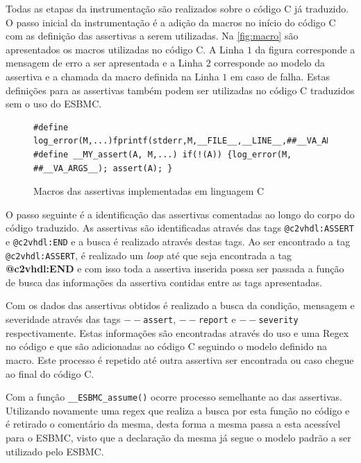 \par
Todas as etapas da instrumentação são realizados sobre o código C já traduzido. O passo inicial da instrumentação é a adição da macros no início do código C com as definição das assertivas a serem utilizadas. Na \autoref{fig:macro} são apresentados os macros utilizadas no código C. A Linha $1$ da figura corresponde a mensagem de erro a ser apresentada e a Linha $2$ corresponde ao modelo da assertiva e a chamada da macro definida na Linha $1$ em caso de falha. Estas definições para as assertivas também podem ser utilizadas no código C traduzidos sem o uso do ESBMC.


\begin{figure}[H]
\caption{\label{fig:macro} Macros das assertivas implementadas em linguagem C}
	\begin{center}
    \begin{minipage}{0.99\textwidth}
    \begin{lstlisting}       
#define log_error(M,...)fprintf(stderr,M,__FILE__,__LINE__,##__VA_ARGS__)
#define __MY_assert(A, M,...) if(!(A)) {log_error(M, ##__VA_ARGS__); assert(A); }
    \end{lstlisting}
    \end{minipage}
	\end{center}
\end{figure}

\par
O passo seguinte é a identificação das assertivas comentadas ao longo do corpo do código traduzido. As assertivas são identificadas através das tags \texttt{@c2vhdl:ASSERT} e \texttt{@c2vhdl:END} e a busca é realizado através destas tags. Ao ser encontrado a tag \texttt{@c2vhdl:ASSERT}, é realizado um \textit{loop} até que seja encontrada a tag \textbf{@c2vhdl:END} e com isso toda a assertiva inserida possa ser passada a função de busca das informações da assertiva contidas entre as tags apresentadas.

\par
Com os dados das assertivas obtidos é realizado a busca da condição, mensagem e severidade através das tags \texttt{$--$assert}, \texttt{$--$report} e \texttt{$--$severity} respectivamente. Estas informações são encontradas através do uso e uma Regex no código e que são adicionadas ao código C seguindo o modelo definido na macro. Este processo é repetido até outra assertiva ser encontrada ou caso chegue ao final do código C.

\par
Com a função \texttt{\_\_ESBMC\_assume()} ocorre processo semelhante ao das assertivas. Utilizando novamente uma regex que realiza a busca por esta função no código e é retirado o comentário da mesma, desta forma a mesma passa a esta acessível para o ESBMC, visto que a declaração da mesma já segue o modelo padrão a ser utilizado pelo ESBMC.

